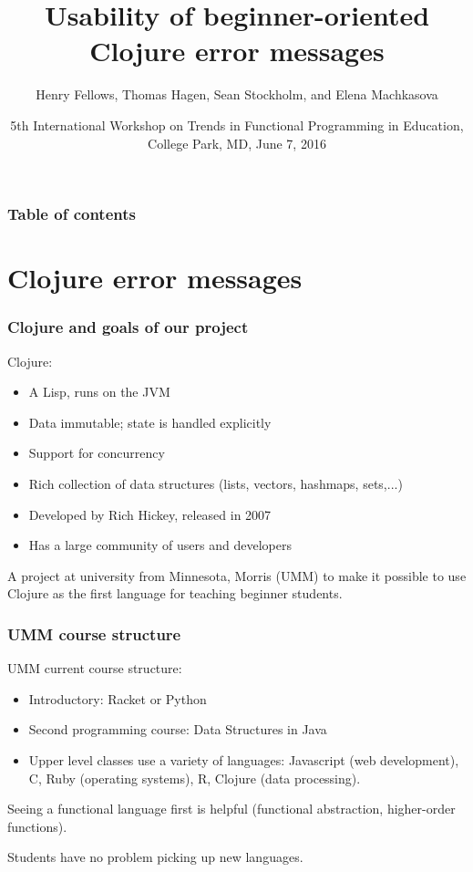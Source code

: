 \documentclass{beamer}
\begin{document}
\title{Usability of beginner-oriented Clojure error messages}
\author{Henry Fellows, Thomas Hagen, Sean Stockholm, 
and Elena Machkasova}
\date{5th International Workshop on Trends in Functional Programming in Education, \\
College Park, MD, June 7, 2016}

\begin{frame}
\titlepage
\end{frame}

\begin{frame}
\frametitle{Table of contents}
\tableofcontents  
\end{frame}

\section{Clojure error messages}

\begin{frame}
\frametitle{Clojure and goals of our project }
Clojure:
\begin{itemize}
\item A Lisp, runs on the JVM
\item Data immutable; state is handled explicitly 
\item Support for concurrency 
\item Rich collection of data structures (lists, vectors, hashmaps, sets,...)
\item Developed by Rich Hickey, released in 2007
\item Has a large community of users and developers 
\end{itemize}

A project at university from Minnesota, Morris (UMM) to make it possible to use Clojure as the first language for teaching beginner students. 
\end{frame}

\begin{frame}
\frametitle{UMM course structure}
UMM current course structure:
\begin{itemize}
\item Introductory: Racket or Python 
\item Second programming course: Data Structures in Java
\item Upper level classes use a variety of languages:  Javascript (web development), C, Ruby (operating systems),  R, Clojure (data processing). 
\end{itemize} 
Seeing a functional language first is helpful (functional abstraction, higher-order functions). 

Students have no problem picking up new languages. 
\end{frame}
\end{document}
